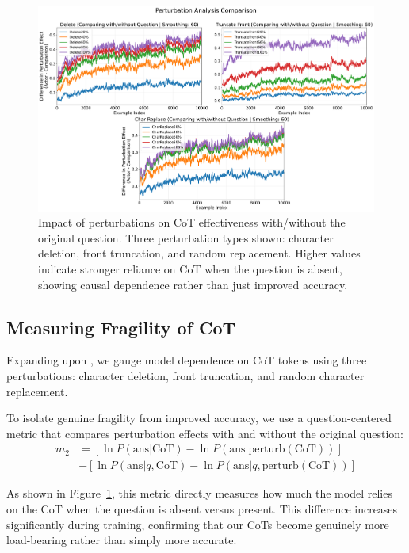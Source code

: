 \documentclass[letterpaper]{article} %
\begin{document}
\begin{figure}[ht]
  \centering
  \includegraphics[width=\textwidth]{Figures/combined_perturbation_plot_comparison_question_centered.png}
  \caption{Impact of perturbations on CoT effectiveness with/without the original question. Three perturbation types shown: character deletion, front truncation, and random replacement. Higher values indicate stronger reliance on CoT when the question is absent, showing causal dependence rather than just improved accuracy.}
  \label{fig:perturbation}
\end{figure}

\subsection{Measuring Fragility of CoT}\label{subsec:fragile}

Expanding upon \citet{lanham2023measuring}, we gauge model dependence on CoT tokens using three perturbations: character deletion, front truncation, and random character replacement.
    
To isolate genuine fragility from improved accuracy, we use a question-centered metric that compares perturbation effects with and without the original question:
\begin{align}
m_2 &= [\ln P(\text{ans}|\text{CoT}) - \ln P(\text{ans}|\text{perturb}(\text{CoT}))] \nonumber\\
&- [\ln P(\text{ans}|q, \text{CoT}) - \ln P(\text{ans}|q, \text{perturb}(\text{CoT}))]
\end{align}

As shown in Figure~\ref{fig:perturbation}, this metric directly measures how much the model relies on the CoT when the question is absent versus present. This difference increases significantly during training, confirming that our CoTs become genuinely more load-bearing rather than simply more accurate.
\end{document}

